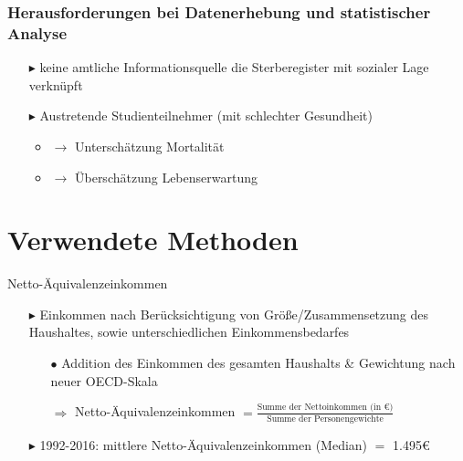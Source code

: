 \documentclass{beamer}
\begin{document}
\begin{frame}
\frametitle{Herausforderungen bei Datenerhebung und statistischer Analyse}
	\begin{itemize}
		\item [$\blacktriangleright$] keine amtliche Informationsquelle die 	Sterberegister mit sozialer Lage verknüpft
		\vspace{0.3cm}
		\item [$\blacktriangleright$] Austretende Studienteilnehmer (mit schlechter Gesundheit)
			\begin{itemize}
				\item $\rightarrow$ Unterschätzung Mortalität
				\item $\rightarrow$ Überschätzung Lebenserwartung
			\end{itemize}
	\end{itemize}
\end{frame}


\section{Verwendete Methoden}
\begin{frame}{Netto-Äquivalenzeinkommen}
	\begin{itemize}
		\item[$\blacktriangleright$] Einkommen nach Berücksichtigung von Größe/Zusammensetzung des Haushaltes, sowie unterschiedlichen Einkommensbedarfes
\vspace{0.3cm}		
		\begin{itemize}
		\item[$\bullet$]	Addition des Einkommen des gesamten Haushalts \& Gewichtung nach neuer OECD-Skala
\vspace{0.2cm}
		\item[$\Rightarrow$] Netto-Äquivalenzeinkommen $=\frac{\text{Summe der Nettoinkommen (in €)}}{\text{Summe der Personengewichte}}$
		\end{itemize}
\vspace{0.3cm}
		\item[$\blacktriangleright$] 1992-2016: mittlere Netto-Äquivalenzeinkommen (Median) $=$ 1.495€
	\end{itemize}
\end{frame}
\end{document}
